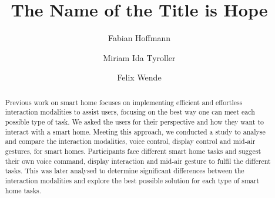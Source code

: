 \documentclass[sigchi]{acmart}
\begin{document}
\title{The Name of the Title is Hope}

\author{Fabian Hoffmann}

\author{Miriam Ida Tyroller}

\author{Felix Wende}

\renewcommand{\shortauthors}{Trovato and Tobin, et al.}

\begin{abstract}
Previous work on smart home focuses on implementing efficient and effortless interaction modalities to assist users, focusing on the best way one can meet each possible type of task. We asked the users for their perspective and how they want to interact with a smart home. Meeting this approach, we conducted a study to analyse and compare the interaction modalities, voice control, display control and mid-air gestures, for smart homes. Participants face different smart home tasks and suggest their own voice command, display interaction and mid-air gesture to fulfil the different tasks. This was later analysed to determine significant differences between the interaction modalities and explore the best possible solution for each type of smart home tasks.
\end{abstract}

\end{document}
